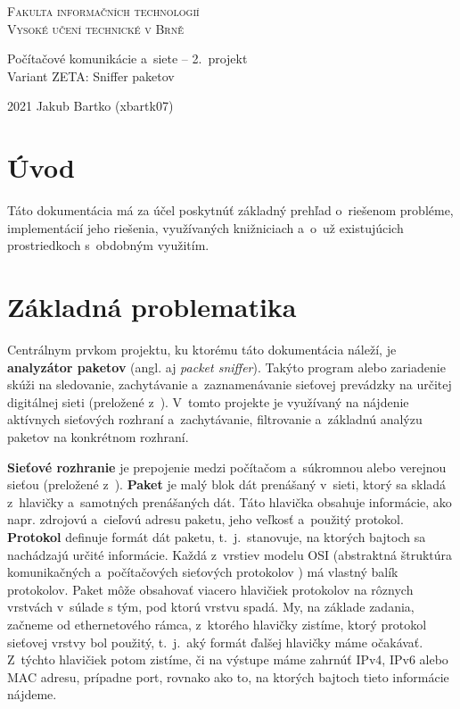 \documentclass[a4paper, 11pt, twocolumn]{article}
\begin{document}
\begin{titlepage}
    \begin{center}
        \Huge
        \textsc{Fakulta informačních technologií \\
        Vysoké učení technické v Brně} \\
        
        \LARGE
        Počítačové komunikácie a~siete -- 2.~projekt \\
        Variant ZETA: Sniffer paketov \\
    \end{center}
    
    {\Large 2021 \hfill
    Jakub Bartko (xbartk07)}
\end{titlepage}

\onecolumn
\tableofcontents
\twocolumn

\section{Úvod}
    Táto dokumentácia má za účel poskytnúť základný prehľad o~riešenom probléme, implementácií jeho riešenia, využívaných knižniciach a~o~už existujúcich prostriedkoch s~obdobným využitím.

\section{Základná problematika}
    Centrálnym prvkom projektu, ku ktorému táto dokumentácia náleží, je \textbf{analyzátor paketov} (angl. aj \textit{packet sniffer}). Takýto program alebo zariadenie skúži na sledovanie, zachytávanie a~zaznamenávanie sieťovej prevádzky na určitej digitálnej sieti (preložené z~\cite{packetanalyzer}). V~tomto projekte je využívaný na nájdenie aktívnych sieťových rozhraní a~zachytávanie, filtrovanie a~základnú analýzu paketov na konkrétnom rozhraní.
    
    \textbf{Sieťové rozhranie} je prepojenie medzi počítačom a~súkromnou alebo verejnou sieťou (preložené z~\cite{networkinterface}). \textbf{Paket} je malý blok dát prenášaný v~sieti, ktorý sa skladá z~hlavičky a~samotných prenášaných dát. Táto hlavička obsahuje informácie, ako napr. zdrojovú a~cieľovú adresu paketu, jeho veľkosť a~použitý protokol. \textbf{Protokol} definuje formát dát paketu, t.~j.~stanovuje, na ktorých bajtoch sa nachádzajú určité informácie. Každá z~vrstiev modelu OSI (abstraktná štruktúra komunikačných a~počítačových sieťových protokolov \cite{osi}) má vlastný balík protokolov. Paket môže obsahovať viacero hlavičiek protokolov na rôznych vrstvách v~súlade s tým, pod ktorú vrstvu spadá. My, na základe zadania, začneme od ethernetového rámca, z~ktorého hlavičky zistíme, ktorý protokol sieťovej vrstvy bol použitý, t.~j.~aký formát ďalšej hlavičky máme očakávať. Z~týchto hlavičiek potom zistíme, či na výstupe máme zahrnúť IPv4, IPv6 alebo MAC adresu, prípadne port, rovnako ako to, na ktorých bajtoch tieto informácie nájdeme.
    
\end{document}
